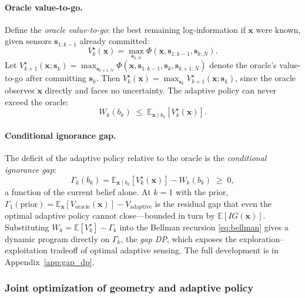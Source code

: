 \documentclass[11pt,a4paper]{article}
\newcommand{\E}{\mathbb{E}}
\begin{document}
\paragraph{Oracle value-to-go.}
Define the \emph{oracle value-to-go}: the best remaining log-information if $\bm{x}$ were known, given sensors $\bm{s}_{1:k-1}$ already committed:
\begin{equation}
  V_k^\star(\bm{x}) = \max_{\bm{s}_{k:N}} \Phi(\bm{x}, \bm{s}_{1:k-1}, \bm{s}_{k:N}).
  \label{eq:oracle_vtg}
\end{equation}
Let $V_{k+1}^\star(\bm{x};\bm{s}_k) = \max_{\bm{s}_{k+1:N}}\Phi(\bm{x}, \bm{s}_{1:k-1}, \bm{s}_k, \bm{s}_{k+1:N})$ denote the oracle's value-to-go after committing $\bm{s}_k$.  Then $V_k^\star(\bm{x}) = \max_{\bm{s}_k} V_{k+1}^\star(\bm{x};\bm{s}_k)$, since the oracle observes $\bm{x}$ directly and faces no uncertainty.  The adaptive policy can never exceed the oracle:
\begin{equation}
  W_k(b_k) \;\leq\; \E_{\bm{x} \mid b_k}\!\left[V_k^\star(\bm{x})\right].
  \label{eq:oracle_bound}
\end{equation}

\paragraph{Conditional ignorance gap.}
The deficit of the adaptive policy relative to the oracle is the \emph{conditional ignorance gap}:
\begin{equation}
  \boxed{\Gamma_k(b_k) = \E_{\bm{x} \mid b_k}\!\left[V_k^\star(\bm{x})\right] - W_k(b_k) \;\geq\; 0,}
  \label{eq:cond_gap}
\end{equation}
a function of the current belief alone.  At $k = 1$ with the prior, $\Gamma_1(\text{prior}) = \E_{\bm{x}}[V_{\text{oracle}}(\bm{x})] - V_{\text{adaptive}}$ is the residual gap that even the optimal adaptive policy cannot close---bounded in turn by $\E[IG(\bm{x})]$.  Substituting $W_k = \E[V_k^\star] - \Gamma_k$ into the Bellman recursion \eqref{eq:bellman} gives a dynamic program directly on $\Gamma_k$, the \emph{gap DP}, which exposes the exploration--exploitation tradeoff of optimal adaptive sensing.  The full development is in Appendix~\ref{app:gap_dp}.

\subsubsection{Joint optimization of geometry and adaptive policy}
\label{subsec:joint_adaptive}
\end{document}
